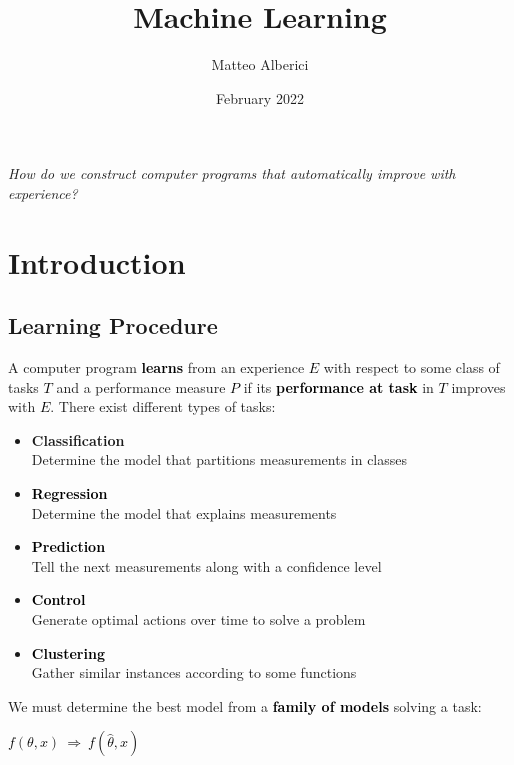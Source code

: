 \documentclass{article}
\title{Machine Learning}
\author{Matteo Alberici}
\date{February 2022}
\newcommand{\bb}[1]{\textcolor{black}{\textbf{#1}}}
\newcommand{\rr}[1]{\textcolor{black}{#1}}
\newcommand{\cc}[1]{\begin{center}\textcolor{black}{#1}\end{center}}
\begin{document}
\maketitle
\vspace{2cm}
\noindent
\begin{center}
   \large\textit{How do we construct computer programs that automatically improve with experience?} 
\end{center}
\newpage
\tableofcontents
\newpage

\section{Introduction}

\subsection{Learning Procedure}
A computer program \bb{learns} from an experience \rr{$E$} with respect to some class of tasks \rr{$T$} and a performance measure \rr{$P$} if its \bb{performance at task} in \rr{$T$} improves with \rr{$E$}. There exist different types of tasks:
\begin{itemize}
    \item \textbf{Classification} 
        \vspace{0.2cm} \\
        Determine the model that partitions measurements in classes
    \item \bb{Regression}
        \vspace{0.2cm} \\
        Determine the model that explains measurements
    \item \bb{Prediction}
        \vspace{0.2cm} \\
        Tell the next measurements along with a confidence level
    \item \bb{Control}
        \vspace{0.2cm} \\
        Generate optimal actions over time to solve a problem
    \item \bb{Clustering} 
        \vspace{0.2cm} \\
        Gather similar instances according to some functions
\end{itemize}
We must determine the best model from a \bb{family of models} solving a task:
\cc{$ f(\theta,x) \ \Longrightarrow \ f(\hat{\theta}, x)$}
\end{document}
